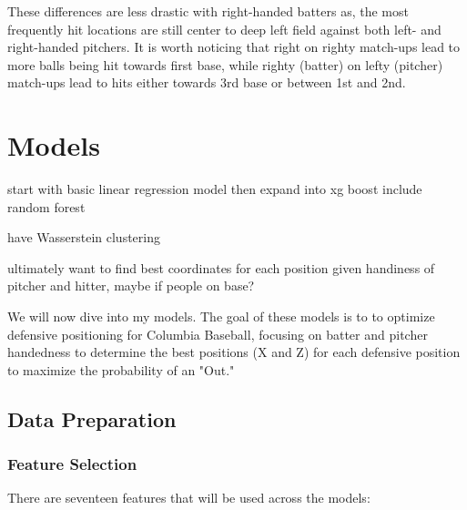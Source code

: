 \documentclass{article}
\begin{document}
These differences are less drastic with right-handed batters as, the most frequently hit locations are still center to deep left field against both left- and right-handed pitchers. It is worth noticing that right on righty match-ups lead to more balls being hit towards first base, while righty (batter) on lefty (pitcher) match-ups lead to hits either towards 3rd base or between 1st and 2nd. 

\newpage
\section{Models}

start with basic linear regression model
then expand into xg boost 
include random forest 

have Wasserstein clustering 

ultimately want to find best coordinates for each position given handiness of pitcher and hitter, maybe if people on base?


We will now dive into my models. The goal of these models is to to optimize defensive positioning for Columbia Baseball, focusing on batter and pitcher handedness to determine the best positions (X and Z) for each defensive position to maximize the probability of an "Out."

\subsection{Data Preparation}
\subsubsection{Feature Selection}
There are seventeen features that will be used across the models:
\end{document}
